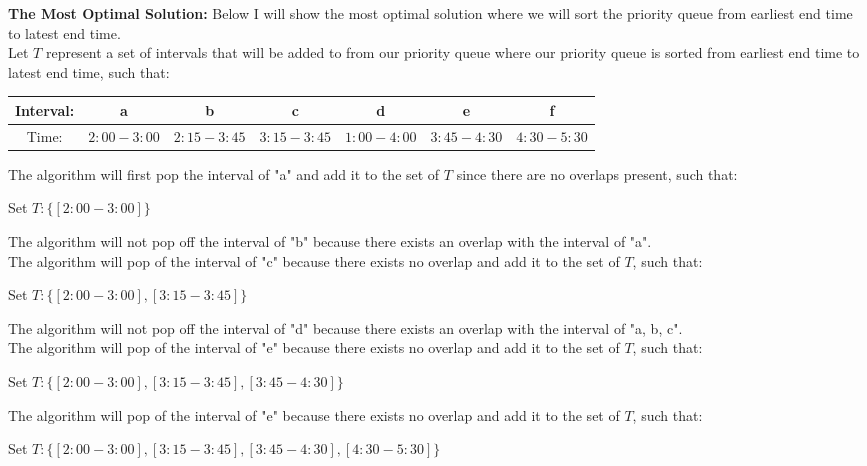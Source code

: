 \documentclass[11pt]{article}
\theoremstyle{definition}
\theoremstyle{definition}
\theoremstyle{definition}
\begin{document}
\textbf{The Most Optimal Solution:}
Below I will show the most optimal solution where we will sort the priority queue from earliest end time to latest end time. \\

Let $T$ represent a set of intervals that will be added to from our priority queue where our priority queue is sorted from earliest end time to latest end time, such that: \\
\begin{center}
\begin{tabular}{ | c | c | c | c | c | c | c | }
 \hline
 Interval:& a & b & c & d & e & f\\  
 \hline
 Time: & $2:00 - 3:00$ & $2:15 - 3:45$ & $3:15 - 3:45$ & $1:00 - 4:00$  & $3:45 - 4:30$ & $4:30 - 5:30$\\
  \hline
\end{tabular}
\end{center}

The algorithm will first pop the interval of "a" and add it to the set of $T$ since there are no overlaps present, such that: \\
\begin{center}
Set $T: \{[2:00 - 3:00]\}$\\
\end{center}

The algorithm will not pop off the interval of "b" because there exists an overlap with the interval of "a". \\

The algorithm will pop of the interval of "c" because there exists no overlap and add it to the set of $T$, such that: \\
\begin{center}
Set $T: \{[2:00 - 3:00], [3:15 - 3:45]\}$\\
\end{center}

The algorithm will not pop off the interval of "d" because there exists an overlap with the interval of "a, b, c". \\

The algorithm will pop of the interval of "e" because there exists no overlap and add it to the set of $T$, such that: \\
\begin{center}
Set $T: \{[2:00 - 3:00], [3:15 - 3:45], [3:45 - 4:30]\}$\\
\end{center}
The algorithm will pop of the interval of "e" because there exists no overlap and add it to the set of $T$, such that: \\
\begin{center}
Set $T: \{[2:00 - 3:00], [3:15 - 3:45], [3:45 - 4:30], [4:30 - 5:30]\}$\\
\end{center}
\end{document}
